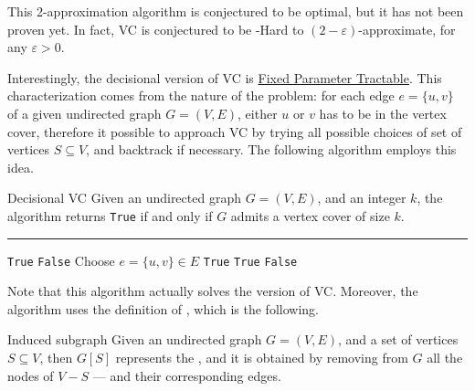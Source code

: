 \documentclass[a4paper, 12pt]{report}
\begin{document}
    This 2-approximation algorithm is conjectured to be optimal, but it has not been proven yet. In fact, VC is conjectured to be \NPclass-Hard to $(2 - \varepsilon)$-approximate, for any $\varepsilon > 0$.

    Interestingly, the decisional version of VC is \href{https://en.wikipedia.org/wiki/Parameterized_complexity#FPT}{Fixed Parameter Tractable}. This characterization comes from the nature of the problem: for each edge $e = \{u, v\}$ of a given undirected graph $G = (V, E)$, either $u$ or $v$ has to be in the vertex cover, therefore it possible to approach VC by trying all possible choices of set of vertices $S \subseteq V$, and backtrack if necessary. The following algorithm employs this idea.

    \begin{framedalgo}{Decisional VC}
        Given an undirected graph $G = (V, E)$, and an integer $k$, the algorithm returns \texttt{True} if and only if $G$ admits a vertex cover of size $k$. \\
        \hrule

        \quad
        \begin{algorithmic}[1]
                    \State {} \texttt{True}
                    \State {} \texttt{False}
                \Else
                    \State Choose $e = \{u, v\} \in E$
                        \State {} \texttt{True}
                    \EndIf
                        \State {} \texttt{True}
                    \EndIf
                    \State {} \texttt{False}
                \EndIf
            \EndFunction
        \end{algorithmic}
    \end{framedalgo}

    Note that this algorithm actually solves the  version of VC. Moreover, the algorithm uses the definition of , which is the following.

    \begin{frameddefn}{Induced subgraph}
        Given an undirected graph $G = (V, E)$, and a set of vertices $S \subseteq V$, then $G[S]$ represents the , and it is obtained by removing from $G$ all the nodes of $V - S$ --- and their corresponding edges.
    \end{frameddefn}
\end{document}
